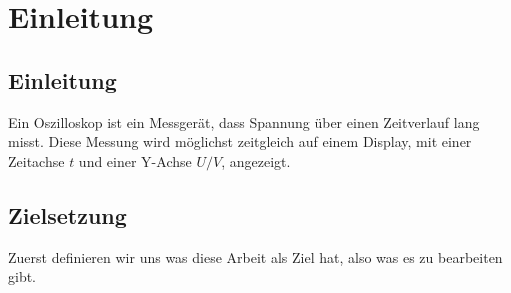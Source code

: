 \section{Einleitung}

\subsection{Einleitung}

Ein Oszilloskop ist ein Messgerät, dass Spannung über einen Zeitverlauf lang misst.
Diese Messung wird möglichst zeitgleich auf einem Display,
mit einer Zeitachse $t$ und einer Y-Achse $U/V$, angezeigt.


\subsection{Zielsetzung}

Zuerst definieren wir uns was diese Arbeit als Ziel hat, also was es zu bearbeiten gibt.
